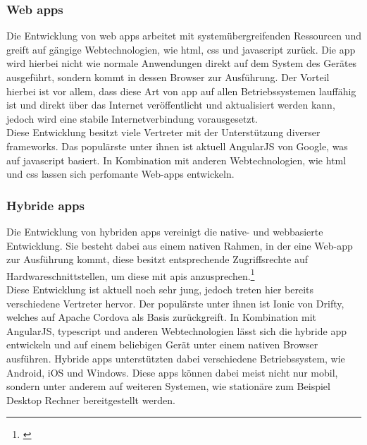 \subsubsection{Web \glspl{app}}\label{web}

Die Entwicklung von web \glspl{app} arbeitet mit systemübergreifenden Ressourcen und greift auf gängige Webtechnologien, wie \gls{html}, \gls{css} und \gls{javascript} zurück. Die \gls{app} wird hierbei nicht wie normale Anwendungen direkt auf dem System des Gerätes ausgeführt, sondern kommt in dessen Browser zur Ausführung. Der Vorteil hierbei ist vor allem, dass diese Art von \gls{app} auf allen Betriebssystemen lauffähig ist und direkt über das Internet veröffentlicht und aktualisiert werden kann, jedoch wird eine stabile Internetverbindung vorausgesetzt.\\
Diese Entwicklung besitzt viele Vertreter mit der Unterstützung diverser \glspl{framework}. Das populärste unter ihnen ist aktuell AngularJS von Google, was auf \gls{javascript} basiert. In Kombination mit anderen Webtechnologien, wie \gls{html} und \gls{css} lassen sich perfomante Web-\glspl{app} entwickeln.

\subsubsection{Hybride \glspl{app}}\label{hybride}

Die Entwicklung von hybriden \glspl{app} vereinigt die native- und webbasierte Entwicklung. Sie besteht dabei aus einem nativen Rahmen, in der eine Web-\gls{app} zur Ausführung kommt, diese besitzt entsprechende Zugriffsrechte auf Hardwareschnittstellen, um diese mit \glspl{api} anzusprechen.\footnote{\citep[vgl.][Native App, Web App und Hybrid App im Überblick]{PetraRiepe.NativeApp}\label{note2x}}\\
Diese Entwicklung ist aktuell noch sehr jung, jedoch treten hier bereits verschiedene Vertreter hervor. Der populärste unter ihnen ist Ionic von Drifty, welches auf Apache Cordova als Basis zurückgreift. In Kombination mit AngularJS, \gls{typescript} und anderen Webtechnologien lässt sich die hybride \gls{app} entwickeln und auf einem beliebigen Gerät unter einem nativen Browser ausführen. Hybride \glspl{app} unterstützten dabei verschiedene Betriebssystem, wie Android, iOS und Windows. Diese \glspl{app} können dabei meist nicht nur mobil, sondern unter anderem auf weiteren Systemen, wie stationäre zum Beispiel Desktop Rechner bereitgestellt werden.

